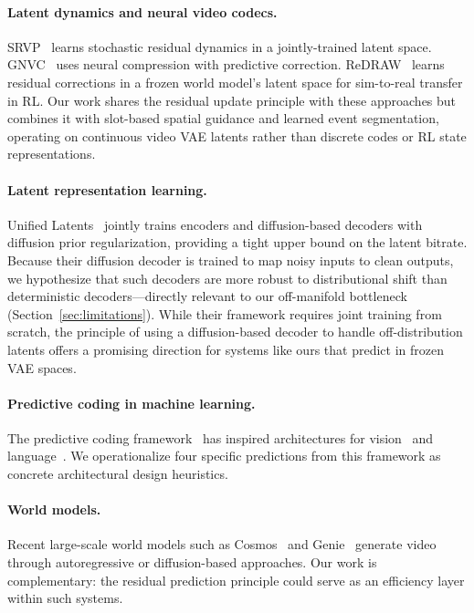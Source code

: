 \documentclass{article}
\begin{document}
\paragraph{Latent dynamics and neural video codecs.}
SRVP~\cite{franceschi2020stochastic} learns stochastic residual
dynamics in a jointly-trained latent space.
GNVC~\cite{ho2024gnvc} uses neural compression with predictive
correction.
ReDRAW~\cite{lanier2025redraw} learns residual corrections in a frozen
world model's latent space for sim-to-real transfer in RL.
Our work shares the residual update principle with these approaches but
combines it with slot-based spatial guidance and learned event
segmentation, operating on continuous video VAE latents rather than
discrete codes or RL state representations.

\paragraph{Latent representation learning.}
Unified Latents~\cite{heek2026unified} jointly trains encoders and
diffusion-based decoders with diffusion prior regularization, providing
a tight upper bound on the latent bitrate.
Because their diffusion decoder is trained to map noisy inputs to
clean outputs, we hypothesize that such decoders are more robust to
distributional shift than deterministic decoders---directly relevant
to our off-manifold bottleneck (Section~\ref{sec:limitations}).
While their framework requires joint training from scratch, the
principle of using a diffusion-based decoder to handle off-distribution
latents offers a promising direction for systems like ours that predict
in frozen VAE spaces.

\paragraph{Predictive coding in machine learning.}
The predictive coding framework~\cite{rao1999predictive,friston2005theory}
has inspired architectures for vision~\cite{lotter2017deep} and
language~\cite{caucheteux2023evidence}.
We operationalize four specific predictions from this framework as
concrete architectural design heuristics.

\paragraph{World models.}
Recent large-scale world models such as
Cosmos~\cite{nvidia2025cosmos} and Genie~\cite{bruce2024genie}
generate video through autoregressive or diffusion-based approaches.
Our work is complementary: the residual prediction principle could
serve as an efficiency layer within such systems.
\end{document}
